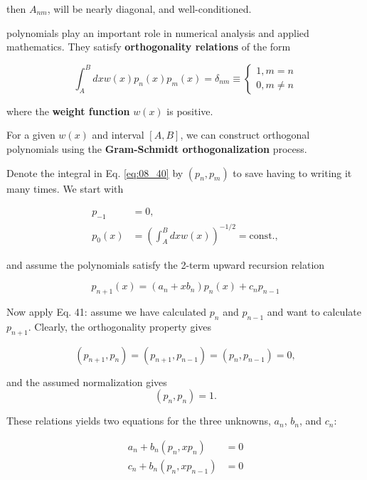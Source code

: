 then $A_{nm}$, will be nearly diagonal, and well-conditioned.

 polynomials play an important role in numerical analysis and applied mathematics. They satisfy \textbf{orthogonality relations} of the form

\begin{equation}\label{eq:08_40}
\int_{A}^{B} dx w(x)p_{n}(x)p_{m}(x) = \delta_{nm} \equiv 
    \begin{cases}
        1, m   = n \\
        0, m \ne n 
    \end{cases}
\end{equation}

where the \textbf{weight function} $w(x)$ is positive.

For a given $w(x)$ and interval $[A,B]$, we can construct orthogonal polynomials using the \textbf{Gram-Schmidt orthogonalization} process.

Denote the integral in Eq. \ref{eq:08_40} by $(p_{n}, p_{m})$ to save having to writing it many times. We start with


  \begin{align*}
p_{-1} & = 0, \\
p_{0}(x) & = (\int_{A}^{B}dx w(x))^{-1/2} = \text{const.} ,
  \end{align*}

and assume the polynomials satisfy the 2-term upward recursion relation

\begin{equation}
p_{n+1}(x) = (a_{n} + xb_{n} ) p_{n}(x) + c_{n}p_{n-1}
\end{equation}

Now apply Eq. 41: assume we have calculated $p_{n}$ and $p_{n-1}$ and want to calculate $p_{n+1}$. Clearly, the orthogonality property gives

\begin{equation}
(p_{n+1},p_{n}) = (p_{n+1},p_{n-1}) = (p_{n},p_{n-1}) = 0,
\end{equation}

and the assumed normalization gives
\begin{equation}
(p_{n},p_{n}) = 1.
\end{equation}

These relations yields two equations for the three unknowns, $a_{n}$, $b_{n}$, and $c_{n}$:

\begin{align*}
a_{n} + b_{n} (p_n, xp_{n})   & = 0 \\
c_{n} + b_{n} (p_n, xp_{n-1}) & = 0
\end{align*}

